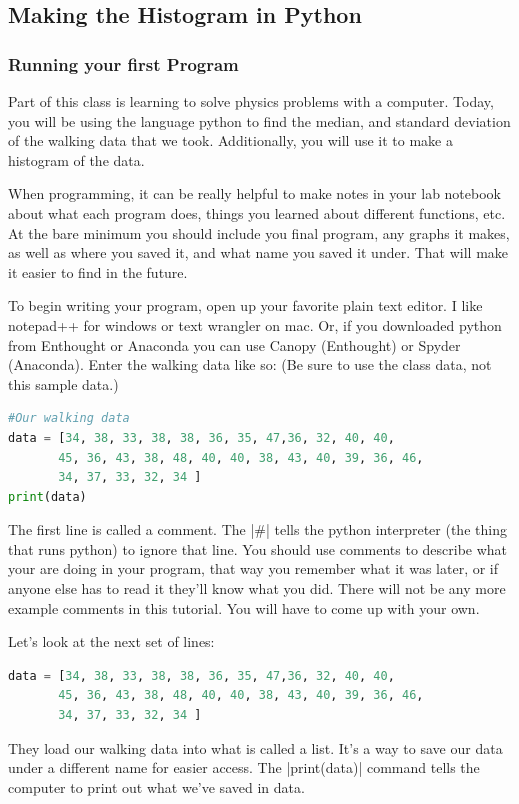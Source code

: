 \documentclass{book}%
\begin{document}
\subsection{Making the Histogram in Python}
\subsubsection{Running your first Program}
Part of this class is learning to solve physics problems with a computer.  Today, you will be using the language python to find the median, and standard deviation of the walking data that we took.  Additionally, you will use it to make a histogram of the data.

When programming, it can be really helpful to make notes in your lab notebook about what each program does, things you learned about different functions, etc.  At the bare minimum you should include you final program, any graphs it makes, as well as where you saved it, and what name you saved it under.  That will make it easier to find in the future.

To begin writing your program, open up your favorite plain text editor.  I like notepad++ for windows or text wrangler on mac. Or, if you downloaded python from Enthought or Anaconda you can use Canopy (Enthought) or Spyder (Anaconda).   Enter the walking data like so: (Be sure to use the class data, not this sample data.)

\begin{lstlisting}[language=Python]
#Our walking data
data = [34, 38, 33, 38, 38, 36, 35, 47,36, 32, 40, 40, 
       45, 36, 43, 38, 48, 40, 40, 38, 43, 40, 39, 36, 46, 
       34, 37, 33, 32, 34 ]
print(data)

\end{lstlisting}
The first line is called a comment.  The |\#| tells the python interpreter (the thing that runs python) to ignore that line.  You should use comments to describe what your are doing in your program, that way you remember what it was later, or if anyone else has to read it they'll know what you did.  There will not be any more example comments in this tutorial.  You will have to come up with your own.

Let's look at the next set of lines:
\begin{lstlisting}[language=Python]
data = [34, 38, 33, 38, 38, 36, 35, 47,36, 32, 40, 40, 
       45, 36, 43, 38, 48, 40, 40, 38, 43, 40, 39, 36, 46, 
       34, 37, 33, 32, 34 ]
\end{lstlisting}
They load our walking data into what is called a list.  It's a way to save our data under a different name for easier access.
The |print(data)| command tells the computer to print out what we've saved in data.  
\end{document}
